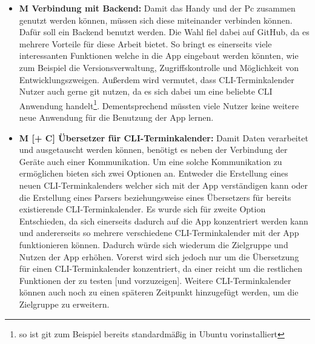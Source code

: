 \begin{itemize}
	\item \textbf{M Verbindung mit Backend:} %
		Damit das Handy und der Pc zusammen genutzt werden können, müssen sich diese miteinander verbinden können. Dafür soll ein Backend benutzt werden. Die Wahl fiel dabei auf GitHub, da es mehrere Vorteile für diese Arbeit bietet. %
			So bringt es einerseits viele interessanten Funktionen welche in die App eingebaut werden könnten, wie zum Beispiel die Versionsverwaltung, Zugriffskontrolle und Möglichkeit von Entwicklungszweigen. %
			Außerdem wird vermutet, dass CLI-Terminkalender Nutzer auch gerne git nutzen, da es sich dabei um eine beliebte CLI Anwendung handelt\footnote{so ist git zum Beispiel bereits standardmäßig in Ubuntu vorinstalliert\cite{nfA_ubuntuManifestGIT}}. Dementsprechend müssten viele Nutzer keine weitere neue Anwendung für die Benutzung der App lernen.%
		
	\item \textbf{M [+ C] Übersetzer für CLI-Terminkalender:} %
		Damit Daten verarbeitet und ausgetauscht werden können, benötigt es neben der Verbindung der Geräte auch einer Kommunikation. %
			Um eine solche Kommunikation zu ermöglichen bieten sich zwei Optionen an. Entweder die Erstellung eines neuen CLI-Terminkalenders welcher sich mit der App verständigen kann oder die Erstellung eines Parsers beziehungsweise eines Übersetzers für bereits existierende CLI-Terminkalender.
				Es wurde sich für zweite Option Entschieden, da sich einerseits dadurch auf die App konzentriert werden kann und andererseits so mehrere verschiedene CLI-Terminkalender mit der App funktionieren können. Dadurch würde sich wiederum die Zielgruppe und Nutzen der App erhöhen.\newline%
		Vorerst wird sich jedoch nur um die Übersetzung für einen CLI-Terminkalender konzentriert, da einer reicht um die restlichen Funktionen der zu testen [und vorzuzeigen].%
		Weitere CLI-Terminkalender können auch noch zu einen späteren Zeitpunkt hinzugefügt werden, um die Zielgruppe zu erweitern.%
		

\end{itemize}
